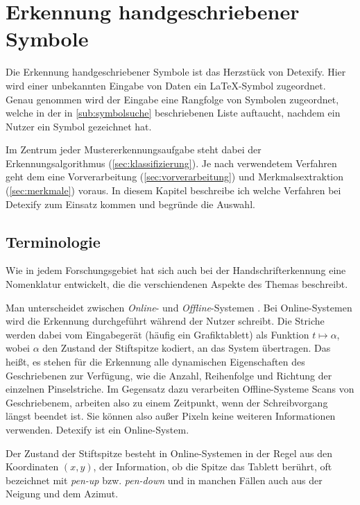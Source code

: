 \chapter{Erkennung handgeschriebener Symbole} %
\label{cha:erkennung_handgeschriebener_symbole}

Die Erkennung handgeschriebener Symbole ist das Herzstück von Detexify. Hier wird einer unbekannten Eingabe von Daten ein \LaTeX-Symbol zugeordnet. Genau genommen wird der Eingabe eine Rangfolge von Symbolen zugeordnet, welche in der in \ref{sub:symbolsuche} beschriebenen Liste auftaucht, nachdem ein Nutzer ein Symbol gezeichnet hat.

Im Zentrum jeder Mustererkennungsaufgabe steht dabei der Erkennungsalgorithmus (\ref{sec:klassifizierung}). Je nach verwendetem Verfahren geht dem eine Vorverarbeitung (\ref{sec:vorverarbeitung}) und Merkmalsextraktion (\ref{sec:merkmale}) voraus. In diesem Kapitel beschreibe ich welche Verfahren bei Detexify zum Einsatz kommen und begründe die Auswahl.

\section{Terminologie} %
\label{sec:terminologie}

Wie in jedem Forschungsgebiet hat sich auch bei der Handschrifterkennung eine Nomenklatur entwickelt, die die verschiendenen Aspekte des Themas beschreibt.

Man unterscheidet zwischen \emph{Online}- und \emph{Offline}-Systemen \cite{Tappert:1990p10302}. Bei Online-Systemen wird die Erkennung durchgeführt während der Nutzer schreibt. Die Striche werden dabei vom Eingabegerät (häufig ein Grafiktablett) als Funktion $ t \mapsto \alpha $, wobei $\alpha$ den Zustand der Stiftspitze kodiert, an das System übertragen. Das heißt, es stehen für die Erkennung alle dynamischen Eigenschaften des Geschriebenen zur Verfügung, wie die Anzahl, Reihenfolge und Richtung der einzelnen Pinselstriche. Im Gegensatz dazu verarbeiten Offline-Systeme Scans von Geschriebenem, arbeiten also zu einem Zeitpunkt, wenn der Schreibvorgang längst beendet ist. Sie können also außer Pixeln keine weiteren Informationen verwenden.
Detexify ist ein Online-System.

Der Zustand der Stiftspitze besteht in Online-Systemen in der Regel aus den Koordinaten $(x,y)$, der Information, ob die Spitze das Tablett berührt, oft bezeichnet mit \emph{pen-up} bzw. \emph{pen-down} und in manchen Fällen auch aus der Neigung und dem Azimut.

